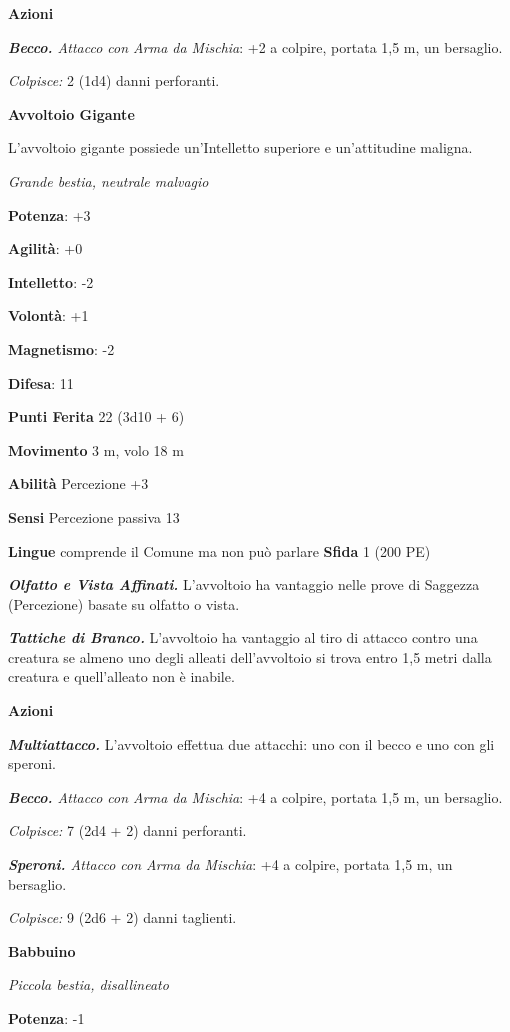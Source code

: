 \begin{multicols}{2}
\textbf{Azioni}

\emph{\textbf{Becco.} Attacco con Arma da Mischia}: +2 a colpire,
portata 1,5 m, un bersaglio.

\emph{Colpisce:} 2 (1d4) danni perforanti.

\textbf{Avvoltoio Gigante}

L'avvoltoio gigante possiede un'Intelletto superiore e un'attitudine
maligna.

\emph{Grande bestia, neutrale malvagio}

\textbf{Potenza}: +3

\textbf{Agilità}: +0

\textbf{Intelletto}: -2

\textbf{Volontà}: +1

\textbf{Magnetismo}: -2

\textbf{Difesa}: 11

\textbf{Punti Ferita} 22 (3d10 + 6)

\textbf{Movimento} 3 m, volo 18 m

\textbf{Abilità} Percezione +3

\textbf{Sensi} Percezione passiva 13

\textbf{Lingue} comprende il Comune ma non può parlare \textbf{Sfida} 1
(200 PE)

\emph{\textbf{Olfatto e Vista Affinati.}} L'avvoltoio ha vantaggio nelle
prove di Saggezza (Percezione) basate su olfatto o vista.

\emph{\textbf{Tattiche di Branco.}} L'avvoltoio ha vantaggio al tiro di
attacco contro una creatura se almeno uno degli alleati dell'avvoltoio
si trova entro 1,5 metri dalla creatura e quell'alleato non è inabile.

\textbf{Azioni}

\emph{\textbf{Multiattacco.}} L'avvoltoio effettua due attacchi: uno con
il becco e uno con gli speroni.

\emph{\textbf{Becco.} Attacco con Arma da Mischia}: +4 a colpire,
portata 1,5 m, un bersaglio.

\emph{Colpisce:} 7 (2d4 + 2) danni perforanti.

\emph{\textbf{Speroni.} Attacco con Arma da Mischia}: +4 a colpire,
portata 1,5 m, un bersaglio.

\emph{Colpisce:} 9 (2d6 + 2) danni taglienti.

\textbf{Babbuino}

\emph{Piccola bestia, disallineato}

\textbf{Potenza}: -1


\end{multicols}
